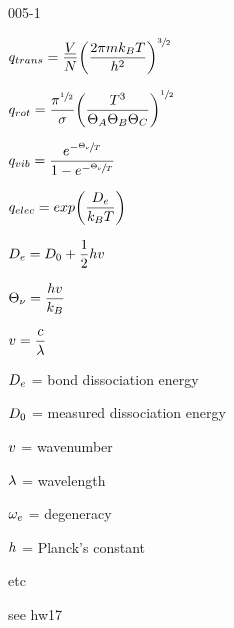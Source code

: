 \begin{mitframe}{005-1}

    
\begin{listone}
        
    \item $\tmpc = \dfrac{\uline{\vol}}{\nummoles}\bigg(\dfrac{2\pie\mass\boltz\Temp}{\planck^{2}}\bigg)^{\sfrac{3}{2}}$
        
    \item $\rmpc=\dfrac{\pie^{\sfrac{1}{2}}}{\molecrad}\bigg(\dfrac{\Temp^{3}}{\dimltemp_{A}\dimltemp_{B}\dimltemp_{C}}\bigg)^{\sfrac{1}{2}}$
        
    \item $\vmpc=\dfrac{\e^{-\sfrac{\vibrfreqfac}{\Temp}}}{1-\e^{-\sfrac{\vibrfreqfac}{\Temp}}}$
          
    \item $\empc=exp\bigg(\dfrac{\eneatom}{\boltz\Temp}\bigg)$
    
    
	\item$\eneatom=\mbde+\dfrac{1}{2}\heattranscoeff\vvel$
    
     \item$\vibrfreqfac=\dfrac{\heattranscoeff\vvel}{\boltz}$
   \item$\vvel=\dfrac{\lightspeed}{\wavel}$
   
    \item $\eneatom$ = bond dissociation energy 
    
    \item$ \mbde$ = measured dissociation energy
    
    \item$\vvel$ = wavenumber       
    \item$\wavel$ = wavelength    
    
    \item$\elecdegen$ = degeneracy
        
    \item$\heattranscoeff$ = Planck's constant
    
         
    \item etc
    
    \item see hw17
    
    
\end{listone}			

\end{mitframe}